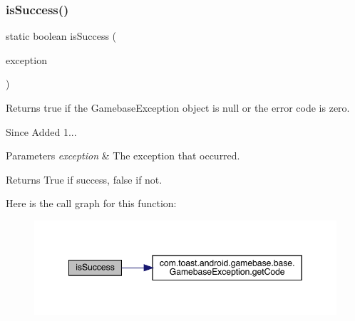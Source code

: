 \subsubsection{\texorpdfstring{is\+Success()}{isSuccess()}}
{\footnotesize\ttfamily static boolean is\+Success (\begin{DoxyParamCaption}\item[{\hyperlink{classcom_1_1toast_1_1android_1_1gamebase_1_1base_1_1_gamebase_exception}{Gamebase\+Exception}}]{exception }\end{DoxyParamCaption})\hspace{0.3cm}{\ttfamily [static]}}



Returns true if the Gamebase\+Exception object is null or the error code is zero. 

\begin{DoxySince}{Since}
Added 1... 
\end{DoxySince}

\begin{DoxyParams}{Parameters}
{\em exception} & The exception that occurred. \\
\hline
\end{DoxyParams}
\begin{DoxyReturn}{Returns}
True if success, false if not. 
\end{DoxyReturn}
Here is the call graph for this function\+:\nopagebreak
\begin{figure}[H]
\begin{center}
\leavevmode
\includegraphics[width=349pt]{classcom_1_1toast_1_1android_1_1gamebase_1_1_gamebase_adec8e86d913bbdb88df6244f7aec6f2a_cgraph}
\end{center}
\end{figure}
\mbox{\label{classcom_1_1toast_1_1android_1_1gamebase_1_1_gamebase_a08e4f03faeb1b5f1e200baaf2ce8f9a2}} 

